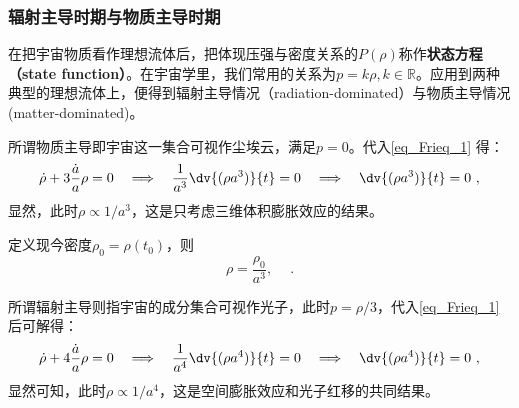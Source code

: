 \subsubsection{辐射主导时期与物质主导时期}
在把宇宙物质看作理想流体后，把体现压强与密度关系的$P(\rho)$称作\textbf{状态方程（state function）}。在宇宙学里，我们常用的关系为$p=k\rho,k\in \mathbb R$。应用到两种典型的理想流体上，便得到辐射主导情况（radiation-dominated）与物质主导情况(matter-dominated)。

所谓物质主导即宇宙这一集合可视作尘埃云，满足$p=0$。代入\autoref{eq_Frieq_1} 得：
\begin{equation}\dot{\rho}+3\frac{\dot{a}}{a}\rho=0\quad\Longrightarrow\quad\frac1{a^3}\dv{(\rho a^3)}{t}=0\quad\Longrightarrow\quad\dv{(\rho a^3)}{t}=0 ~,\end{equation}
显然，此时$\rho\propto 1/a^3$，这是只考虑三维体积膨胀效应的结果。

定义现今密度$\rho_0=\rho(t_0)$，则
\begin{equation}
\rho=\frac{\rho_0}{a^3},\quad ~.
\end{equation}

所谓辐射主导则指宇宙的成分集合可视作光子，此时$p=\rho/3$，代入\autoref{eq_Frieq_1} 后可解得：
\begin{equation}\dot{\rho}+4\frac{\dot{a}}{a}\rho=0\quad\Longrightarrow\quad\frac1{a^4}\dv{(\rho a^4)}{t}=0\quad\Longrightarrow\quad\dv{(\rho a^4)}{t} =0~,\end{equation}
显然可知，此时$\rho\propto  1/a^4$，这是空间膨胀效应和光子红移的共同结果。
